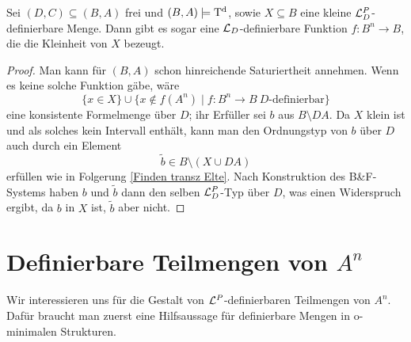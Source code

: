 \begin{lemma}\label{Speziell definierbare kleine Mengen}
	Sei $(D,C)\subseteq(B,A)$ frei und $(B,A)\models\operatorname{T^d}$, sowie $X\subseteq B$ eine kleine $\mathcal{L}^P_D$-definierbare Menge. Dann gibt es sogar eine $\mathcal{L}_D$-definierbare Funktion $f:B^n\rightarrow B$, die die Kleinheit von $X$ bezeugt.
\end{lemma}
\begin{proof}
	Man kann für $(B,A)$ schon hinreichende Saturiertheit annehmen. Wenn es keine solche Funktion gäbe, wäre $$\{x\in X\}\cup\{x\notin f(A^n)\mid f:B^n\rightarrow B\ D\text{-definierbar}\}$$ eine konsistente Formelmenge über $D$; ihr Erfüller sei $b$ aus $B\setminus DA$. Da $X$ klein ist und als solches kein Intervall enthält, kann man den Ordnungstyp von $b$ über $D$ auch durch ein Element $$\tilde{b}\in B\setminus(X\cup DA)$$ erfüllen wie in Folgerung \ref{Finden transz Elte}. Nach Konstruktion des B\&F-Systems haben $b$ und $\tilde{b}$ dann den selben $\mathcal{L}^P_D$-Typ über $D$, was einen Widerspruch ergibt, da $b$ in $X$ ist, $\tilde{b}$ aber nicht.
\end{proof}

\section{Definierbare Teilmengen von $A^n$}
Wir interessieren uns für die Gestalt von $\mathcal{L}^P$-definierbaren Teilmengen von $A^n$. Dafür braucht man zuerst eine Hilfsaussage für definierbare Mengen in o-minimalen Strukturen.

